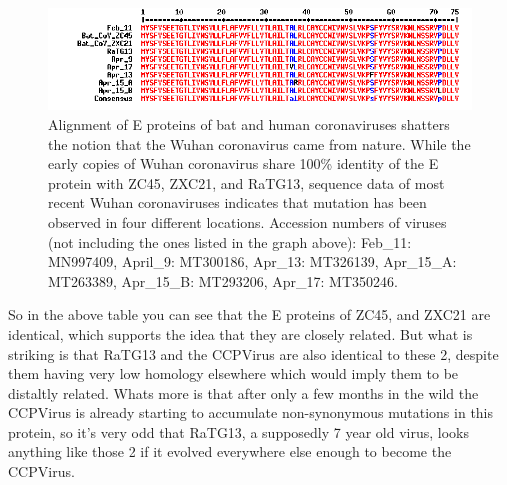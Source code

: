 \documentclass[11pt]{article}
\begin{document}
\begin{figure}[htbp]
\centering
\includegraphics[width=.9\linewidth]{./images/e-protein.png}
\caption{Alignment of E proteins of bat and human coronaviruses shatters the notion that the Wuhan coronavirus came from nature. While the early copies of Wuhan coronavirus share 100\% identity of the E protein with ZC45, ZXC21, and RaTG13, sequence data of most recent Wuhan coronaviruses indicates that mutation has been observed in four different locations. Accession numbers of viruses (not including the ones listed in the graph above): Feb\_11: MN997409, April\_9: MT300186, Apr\_13: MT326139, Apr\_15\_A: MT263389, Apr\_15\_B: MT293206, Apr\_17: MT350246.}
\end{figure}

So in the above table you can see that the E proteins of ZC45, and ZXC21 are identical, which supports the idea that they are closely related. But what is striking is that RaTG13 and the CCPVirus are also identical to these 2, despite them having very low homology elsewhere which would imply them to be distaltly related. Whats more is that after only a few months in the wild the CCPVirus is already starting to accumulate non-synonymous mutations in this protein, so it's very odd that RaTG13, a supposedly 7 year old virus, looks anything like those 2 if it evolved everywhere else enough to become the CCPVirus.
\end{document}
